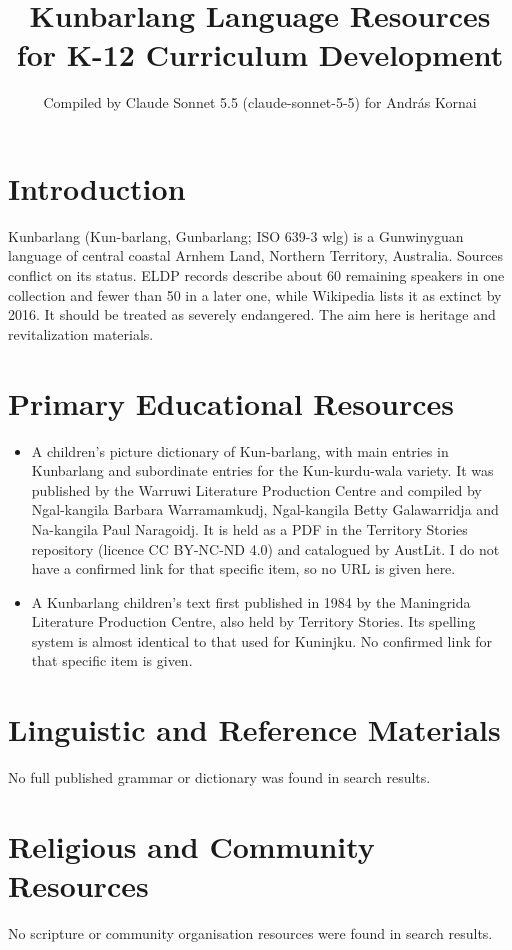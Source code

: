 \documentclass[12pt]{article}
\title{Kunbarlang Language Resources for K-12 Curriculum Development}
\author{Compiled by Claude Sonnet 5.5 (claude-sonnet-5-5) for Andr\'as Kornai}
\date{}
\begin{document}
\maketitle

\section{Introduction}
Kunbarlang (Kun-barlang, Gunbarlang; ISO 639-3 wlg) is a Gunwinyguan language of central coastal Arnhem Land, Northern Territory, Australia. Sources conflict on its status. ELDP records describe about 60 remaining speakers in one collection and fewer than 50 in a later one, while Wikipedia lists it as extinct by 2016. It should be treated as severely endangered. The aim here is heritage and revitalization materials.

\section{Primary Educational Resources}
\begin{itemize}
\item A children's picture dictionary of Kun-barlang, with main entries in Kunbarlang and subordinate entries for the Kun-kurdu-wala variety. It was published by the Warruwi Literature Production Centre and compiled by Ngal-kangila Barbara Warramamkudj, Ngal-kangila Betty Galawarridja and Na-kangila Paul Naragoidj. It is held as a PDF in the Territory Stories repository (licence CC BY-NC-ND 4.0) and catalogued by AustLit. I do not have a confirmed link for that specific item, so no URL is given here.
\item A Kunbarlang children's text first published in 1984 by the Maningrida Literature Production Centre, also held by Territory Stories. Its spelling system is almost identical to that used for Kuninjku. No confirmed link for that specific item is given.
\end{itemize}

\section{Linguistic and Reference Materials}
No full published grammar or dictionary was found in search results.

\section{Religious and Community Resources}
No scripture or community organisation resources were found in search results.
\end{document}
